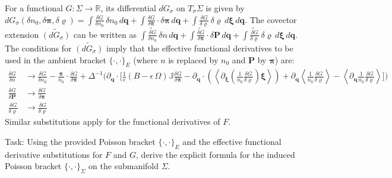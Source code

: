 \documentclass[10pt]{article}
\begin{document}
For a functional $G:\Sigma\rightarrow\mathbb{R}$, its differential $dG_\sigma$ on $T_\sigma\Sigma$ is given by $dG_\sigma(\delta n_0,\delta\bm{\pi},\delta\varrho) = \int \frac{\delta G}{\delta n_0}\,\delta n_0\,d\bm{q} + \int \frac{\delta G}{\delta \bm{\pi}}\cdot\delta\bm{\pi}\,d\bm{q} + \int\frac{\delta G}{\delta\varrho}\,\delta\varrho\,d\bm{\xi}\,d\bm{q}$.
The covector extension $\widetilde{(dG_\sigma)}$ can be written as $\int \widetilde{\frac{\delta G}{\delta n_0}}\,\delta n\,d\bm{q} + \int \widetilde{\frac{\delta G}{\delta\bm{\pi}}}\cdot \delta\bm{P}\,d\bm{q} + \int \widetilde{\frac{\delta G}{\delta\varrho}}\,\delta\varrho\,d\bm{\xi}\,d\bm{q}$.
The conditions for $\widetilde{(dG_\sigma)}$ imply that the effective functional derivatives to be used in the ambient bracket $\{\cdot,\cdot\}_E$ (where $n$ is replaced by $n_0$ and $\bm{P}$ by $\bm{\pi}$) are:
\begin{align*}
\frac{\delta G}{\delta n}&\rightarrow \frac{\delta G}{\delta n_0} -\frac{\bm{\pi}}{n_0}\cdot\frac{\delta G}{\delta\bm{\pi}} + \Delta^{-1}\bigg(\partial_{\bm{q}}\cdot\bigg[\frac{1}{\epsilon}(B-\epsilon\,\Omega)\mathbb{J}\frac{\delta G}{\delta\bm{\pi}} - \partial_{\bm{q}}\cdot\left(\left\langle\partial_{\bm{\xi}}\left(\frac{1}{n_0}\frac{\delta G}{\delta\varrho}\right)\bm{\xi}\right\rangle\right) + \partial_{\bm{q}}\left\langle\frac{1}{n_0}\frac{\delta G}{\delta \varrho}\right\rangle - \left\langle\partial_{\bm{q}}\frac{1}{n_0}\frac{\delta G}{\delta\varrho}\right\rangle\bigg]\bigg)\\
\frac{\delta G}{\delta\bm{P}}&\rightarrow \frac{\delta G}{\delta\bm{\pi}}\\
\frac{\delta G}{\delta\varrho} & \rightarrow\frac{\delta G}{\delta\varrho}
\end{align*}
Similar substitutions apply for the functional derivatives of $F$.

Task:
Using the provided Poisson bracket $\{\cdot,\cdot\}_E$ and the effective functional derivative substitutions for $F$ and $G$, derive the explicit formula for the induced Poisson bracket $\{\cdot,\cdot\}_\Sigma$ on the submanifold $\Sigma$.
\end{document}
